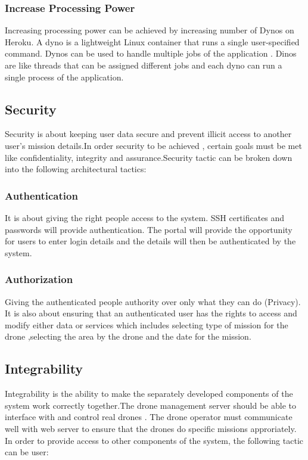 \documentclass{article}
\begin{document}
	\subsubsection{Increase Processing Power}
	Increasing processing power can be achieved by increasing number of Dynos on Heroku. A dyno is a lightweight Linux container that runs a single user-specified command. Dynos can be used to handle multiple jobs of the application . Dinos are like threads that can be assigned different jobs and each dyno can run a single process of the application.
	\subsection{Security}
	Security is about keeping user data secure and prevent illicit access to another user’s mission details.In order security to be achieved , certain goals must be met like confidentiality, integrity and assurance.Security tactic can be broken down into the following architectural tactics: 
	\subsubsection{Authentication}
	It is about giving the right people access to the system. SSH certificates and passwords will provide authentication. The portal will provide the opportunity for users to enter login details and the details will then be authenticated by the system. 
	\subsubsection{Authorization}
	Giving the authenticated people authority over only what they can do (Privacy). It is also about ensuring that an authenticated user has the rights to access and modify either data or services which includes selecting type of mission for the drone ,selecting the area by the drone and the date for the mission.
	
	\subsection{Integrability}
	Integrability is the ability to make the separately developed components of the system work correctly together.The drone management server should be able to interface with and control real drones . The drone operator must communicate well with web server to ensure that the drones do specific missions approriately. In order to provide access to other components of the system, the following tactic can be user:
	
\end{document}
